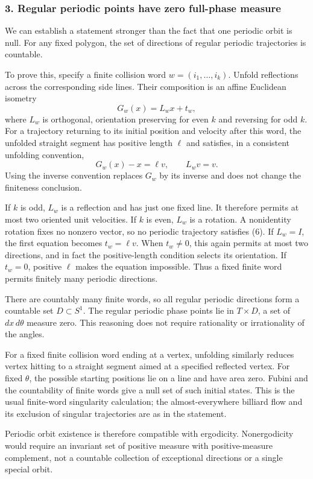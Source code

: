 \documentclass[11pt]{article}
\begin{document}
\subsubsection{3. Regular periodic points have zero full-phase measure}
We can establish a statement stronger than the fact that one periodic orbit is null. For any fixed polygon, the set of directions of regular periodic trajectories is countable.

To prove this, specify a finite collision word $w=(i_1,\ldots,i_k)$. Unfold reflections across the corresponding side lines. Their composition is an affine Euclidean isometry
\[
 G_w(x)=L_wx+t_w,
\]
where $L_w$ is orthogonal, orientation preserving for even $k$ and reversing for odd $k$. For a trajectory returning to its initial position and velocity after this word, the unfolded straight segment has positive length $\ell$ and satisfies, in a consistent unfolding convention,
\[
 G_w(x)-x=\ell v,\qquad L_wv=v.                          \tag{6}
\]
Using the inverse convention replaces $G_w$ by its inverse and does not change the finiteness conclusion.

If $k$ is odd, $L_w$ is a reflection and has just one fixed line. It therefore permits at most two oriented unit velocities. If $k$ is even, $L_w$ is a rotation. A nonidentity rotation fixes no nonzero vector, so no periodic trajectory satisfies (6). If $L_w=I$, the first equation becomes $t_w=\ell v$. When $t_w\ne0$, this again permits at most two directions, and in fact the positive-length condition selects its orientation. If $t_w=0$, positive $\ell$ makes the equation impossible. Thus a fixed finite word permits finitely many periodic directions.

There are countably many finite words, so all regular periodic directions form a countable set $D\subset S^1$. The regular periodic phase points lie in $T\times D$, a set of $dx\,d\theta$ measure zero. This reasoning does not require rationality or irrationality of the angles.

For a fixed finite collision word ending at a vertex, unfolding similarly reduces vertex hitting to a straight segment aimed at a specified reflected vertex. For fixed $\theta$, the possible starting positions lie on a line and have area zero. Fubini and the countability of finite words give a null set of such initial states. This is the usual finite-word singularity calculation; the almost-everywhere billiard flow and its exclusion of singular trajectories are as in the statement.

Periodic orbit existence is therefore compatible with ergodicity. Nonergodicity would require an invariant set of positive measure with positive-measure complement, not a countable collection of exceptional directions or a single special orbit.
\end{document}
